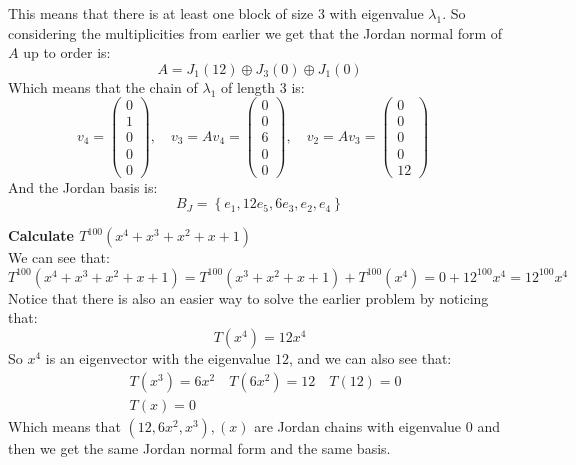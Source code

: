 \documentclass[11pt,a4paper]{article}
\theoremstyle{plain}
\begin{document}
	This means that there is at least one block of size $3$ with eigenvalue
	$\lambda_1$. So considering the multiplicities from earlier we get that
	the Jordan normal form of $A$ up to order is:
	\[
		A = J_1(12) \oplus J_3(0) \oplus J_1(0)
	\]
	Which means that the chain of $\lambda_1$ of length $3$ is:
	\[
		v_4 = \begin{pmatrix} 0 \\ 1 \\ 0 \\ 0 \\ 0 \end{pmatrix}, \quad
		v_3 = Av_4 = \begin{pmatrix} 0 \\ 0 \\ 6 \\ 0 \\ 0 \end{pmatrix}, \quad
		v_2 = Av_3 = \begin{pmatrix} 0 \\ 0 \\ 0 \\ 0 \\ 12 \end{pmatrix} \quad
	\]
	And the Jordan basis is:
	\[
		B_J = 
		\left\{
			e_1, 12e_5, 6e_3, e_2, e_4
		\right\}
	\]
	
	\newpage
	\noindent
	\textbf{Calculate $T^{100}(x^4+x^3+x^2+x+1)$} \\
	We can see that:
	\[
		T^{100}(x^4+x^3+x^2+x+1) = 
		T^{100}(x^3+x^2+x+1) + 
		T^{100}(x^4) = 
		0 + 12^{100}x^4 = 
		12^{100}x^4
	\]
	Notice that there is also an easier way to solve the earlier problem by noticing
	that:
	\[
		T(x^4) = 12x^4
	\]
	So $x^4$ is an eigenvector with the eigenvalue $12$, and we can also see that:
	\begin{align*}
		&T(x^3) = 6x^2 \quad T(6x^2) = 12 \quad T(12) = 0 \\
		&T(x) = 0
	\end{align*}
	Which means that $(12,6x^2,x^3), (x)$ are Jordan chains with eigenvalue $0$
	and then we get the same Jordan normal form and the same basis.
	
	\newpage
\end{document}
